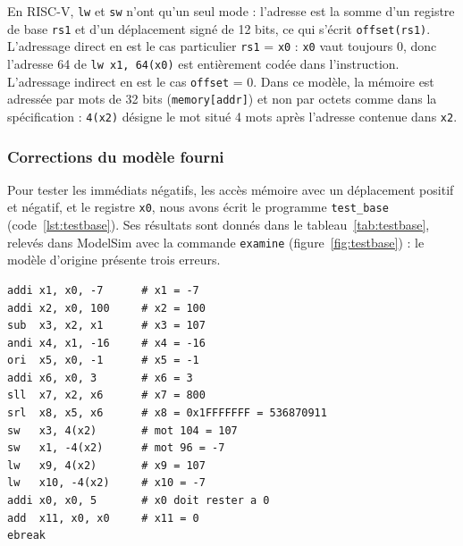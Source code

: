 En RISC-V, \texttt{lw} et \texttt{sw} n'ont qu'un seul mode : l'adresse est la somme d'un
registre de base \texttt{rs1} et d'un déplacement signé de 12 bits, ce qui s'écrit
\texttt{offset(rs1)}. L'adressage direct en est le cas particulier \texttt{rs1} = \texttt{x0} :
\texttt{x0} vaut toujours 0, donc l'adresse 64 de \texttt{lw x1, 64(x0)} est entièrement codée
dans l'instruction. L'adressage indirect en est le cas \texttt{offset} = 0. Dans ce modèle, la
mémoire est adressée par mots de 32 bits (\texttt{memory[addr]}) et non par octets comme dans
la spécification : \texttt{4(x2)} désigne le mot situé 4 mots après l'adresse contenue dans
\texttt{x2}.

\subsubsection{Corrections du modèle fourni}
\label{sec:corrections}

Pour tester les immédiats négatifs, les accès mémoire avec un déplacement positif et négatif,
et le registre \texttt{x0}, nous avons écrit le programme \texttt{test\_base}
(code~\ref{lst:testbase}). Ses résultats sont donnés dans le tableau~\ref{tab:testbase}, relevés
dans ModelSim avec la commande \texttt{examine} (figure~\ref{fig:testbase}) : le modèle d'origine
présente trois erreurs.

\noindent\begin{minipage}{\linewidth}
\begin{lstlisting}[style=code, caption={Programme de test \texttt{test\_base.s}}, label={lst:testbase}]
addi x1, x0, -7      # x1 = -7
addi x2, x0, 100     # x2 = 100
sub  x3, x2, x1      # x3 = 107
andi x4, x1, -16     # x4 = -16
ori  x5, x0, -1      # x5 = -1
addi x6, x0, 3       # x6 = 3
sll  x7, x2, x6      # x7 = 800
srl  x8, x5, x6      # x8 = 0x1FFFFFFF = 536870911
sw   x3, 4(x2)       # mot 104 = 107
sw   x1, -4(x2)      # mot 96 = -7
lw   x9, 4(x2)       # x9 = 107
lw   x10, -4(x2)     # x10 = -7
addi x0, x0, 5       # x0 doit rester a 0
add  x11, x0, x0     # x11 = 0
ebreak
\end{lstlisting}
\end{minipage}\par

